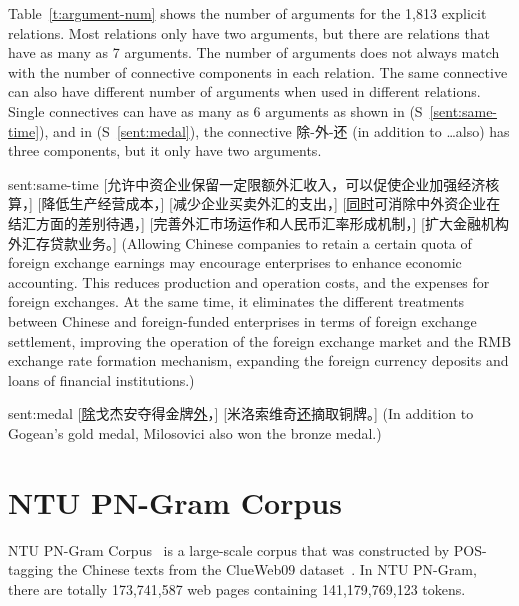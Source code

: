 

Table~\ref{t:argument-num} shows the number of arguments for the 1,813 explicit
relations. Most relations only have two arguments, but there are relations
that have as many as 7 arguments. The number of arguments does not always
match with the number of connective components in each relation. The same
connective can also have different number of arguments when used in
different relations. Single connectives can have as many as 6 arguments
as shown in (S~\ref{sent:same-time}), and in (S~\ref{sent:medal}),
the connective 除-外-还 (in addition to \ldots also)
has three components, but it only have two arguments.



\begin{sent}{sent:same-time}{}
    [允许中资企业保留一定限额外汇收入，可以促使企业加强经济核算，]
    [降低生产经营成本，]
    [减少企业买卖外汇的支出，]
    [\underline{同时}可消除中外资企业在结汇方面的差别待遇，]
    [完善外汇市场运作和人民币汇率形成机制，]
    [扩大金融机构外汇存贷款业务。]
    (Allowing Chinese companies to retain a certain quota of foreign exchange earnings
     may encourage enterprises to enhance economic accounting.
     This reduces production and operation costs, and the expenses for foreign
     exchanges.  At the same time, it eliminates the different treatments between
     Chinese and foreign-funded enterprises in terms of foreign exchange settlement,
     improving the operation of the foreign exchange market and the RMB
     exchange rate formation mechanism, expanding the foreign currency deposits and
     loans of financial institutions.)
\end{sent}

\begin{sent}{sent:medal}{}
    [\underline{除}戈杰安夺得金牌\underline{外}，]
    [米洛索维奇\underline{还}摘取铜牌。]
    (In addition to Gogean's gold medal, Milosovici also won the bronze medal.)
\end{sent}

\section{NTU PN-Gram Corpus}

NTU PN-Gram Corpus~\citep{yu2012development} is a large-scale corpus that was
constructed by POS-tagging the Chinese texts from the ClueWeb09
dataset~\citep{callan2009clueweb09}. In NTU PN-Gram, there are totally 173,741,587
web pages containing 141,179,769,123 tokens.

